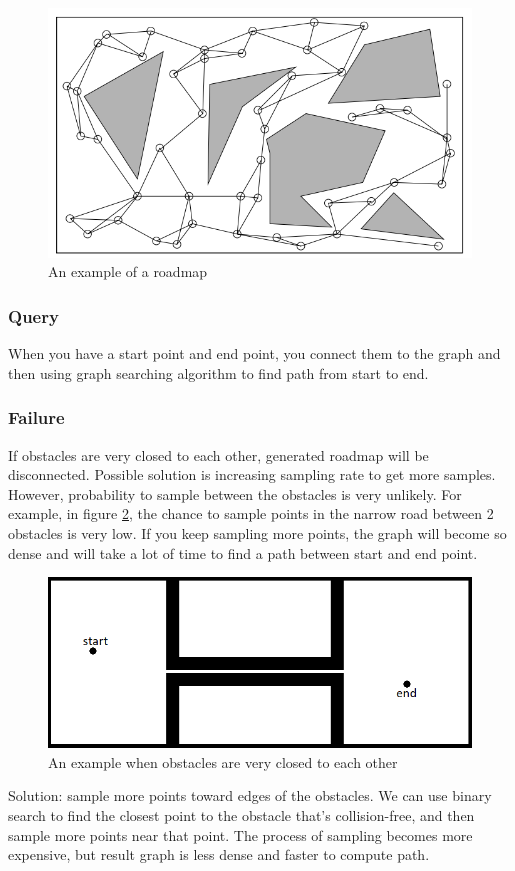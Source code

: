 \documentclass[11pt]{article}
\begin{document}
\begin{figure}[h]
\includegraphics{roadmap}
\centering
\caption{An example of a roadmap }
\label{fig:roadmap_example}
\end{figure}

\subsubsection{Query}
When you have a start point and end point, you connect them to the graph and then using graph searching algorithm to find path from start to end.

\subsubsection{Failure}
If obstacles are very closed to each other, generated roadmap will be disconnected. Possible solution is increasing sampling rate to get more samples. However, probability to sample between the obstacles is very unlikely. For example, in figure \ref{fig:closed_obs}, the chance to sample points in the narrow road between 2 obstacles is very low. If you keep sampling more points, the graph will become so dense and will take a lot of time to find a path between start and end point.\\
\begin{figure}
\includegraphics{closed_obs}
\centering
\caption{An example when obstacles are very closed to each other}
\label{fig:closed_obs}
\end{figure}
Solution: sample more points toward edges of the obstacles. We can use binary search to find the closest point to the obstacle that's collision-free, and then sample more points near that point. The process of sampling becomes more expensive, but result graph is less dense and faster to compute path.
\end{document}
